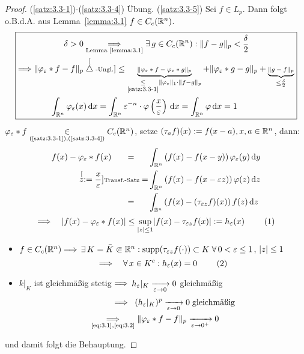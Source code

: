 \begin{proof}
  (\ref{satz:3.3-1})-(\ref{satz:3.3-4}) Übung. \newline
  (\ref{satz:3.3-5}) Sei $f\in L_p$. Dann folgt o.B.d.A. aus Lemma~\ref{lemma:3.1} $f\in C_c(\mathbb{R}^n)$.
    \begin{align*}
      \boxed{\begin{aligned}
          \delta>0 & \underset{\scriptsize\text{Lemma~\ref{lemma:3.1}}}{\Longrightarrow}
          \exists \, g\in C_c(\mathbb{R}^n): \lVert f-g\rVert_p<\frac \delta 2 \\
          \Longrightarrow\lVert \varphi_\varepsilon\ast f-f\rVert_p & \stackrel[\triangle\scriptsize\text{-Ungl.}]{}\leq 
          \underbrace{\lVert \varphi_\varepsilon\ast f-\varphi_\varepsilon\ast g\rVert_p}
          _{\underset{\scriptsize\eqref{satz:3.3-1}}\leq \lVert \varphi_\varepsilon\rVert_1\cdot\lVert f-g\rVert_p}
          +\lVert \varphi_\varepsilon\ast g-g\rVert_p+\underbrace{\lVert g-f\rVert_p}
          _{\leq\frac\delta 2} \\
          \int_{\mathbb{R}^n}\varphi_\varepsilon(x&)  \,\mathrm{d} x  =\int_{\mathbb{R}^n}\varepsilon^{-n}\cdot\varphi\left(\frac x{\varepsilon}\right)\,\mathrm{d} x =\int_{\mathbb{R}^n}\varphi \,\mathrm{d} x=1
        \end{aligned}}
    \end{align*}
  $\varphi_\varepsilon\ast f\underset{\scriptsize(\ref{satz:3.3-1}),(\ref{satz:3.3-4})}\in C_c(\mathbb{R}^n)$, setze $(\tau_a f)(x):=f(x-a), x,a\in\mathbb{R}^n$, dann:
  \begin{align*}
    f(x)-\varphi_\varepsilon\ast f(x)\quad \,\,\,\,=\quad \,\,\,\,&\int_{\mathbb{R}^n}\left(
      f(x)-f(x-y)
    \right)\varphi_\varepsilon(y)\,\mathrm{d} y \\
    \stackrel[z:=\frac x{\varepsilon}]{\scriptsize\textnormal{Transf.-Satz}}=
    &\int_{\mathbb{R}^n}\left(
      f(x)-f(x-\varepsilon z)
    \right)\varphi(z)\,\mathrm{d} z \\
    = \quad \,\,\,\, &\int_{\bar{\mathbb{B}}^n}\left(
      f(x)-(\tau_{\varepsilon z}f)(x)
    \right)f(z)\,\mathrm{d} z
    \end{align*}
  \[
  \Ra\quad \abs{f(x)-\varphi_\epsilon\ast f(x)}\leq
  \sup_{\abs z\leq 1}\abs{f(x)-\tau_{\epsilon z}f(x)}:=h_\epsilon(x)\eq{eq:3.1}
  \]
  \begin{itemize}
  \item $f\in C_c(\mathbb{R}^n)\Longrightarrow\, \exists \, K=\bar K\Subset\mathbb{R}^n:\operatorname{supp}(\tau_{\varepsilon z}f(\cdot))\subset K\;\forall \, 0<\varepsilon\leq 1$, $\lvert z\rvert\leq 1$
    \[
    \Ra\quad\fa\, x\in K^c:h_\epsilon(x)=0\eq{eq:3.2}
    \]
  \item $k\vert_K$ ist gleichmäßig stetig $\Longrightarrow$ $h_\varepsilon\vert_K\xrightarrow[\varepsilon\rightarrow 0]{}0$ gleichmäßig
    \begin{align*}
      \Longrightarrow\ \, \, \,  &(h_\varepsilon\vert_K)^p\xrightarrow[\varepsilon\rightarrow 0]{} 0 \;\text{gleichmäßig} \\
      \underset{\scriptsize\eqref{eq:3.1},\eqref{eq:3.2}}{\Longrightarrow}&\;\lVert \varphi_\varepsilon\ast f-f\rVert_p\xrightarrow[\varepsilon\rightarrow0^+]{}0
    \end{align*}
  \end{itemize}
  und damit folgt die Behauptung.
\end{proof}

